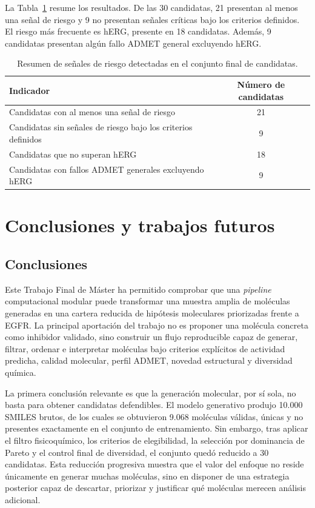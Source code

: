 \documentclass[IB]{TFUOC}%
\begin{document}
La Tabla~\ref{tab:riesgos_shortlist_resultados} resume los resultados. De las 30 candidatas, 21 presentan al menos una señal de riesgo y 9 no presentan señales críticas bajo los criterios definidos. El riesgo más frecuente es hERG, presente en 18 candidatas. Además, 9 candidatas presentan algún fallo ADMET general excluyendo hERG.

\begin{table}[H]
    \centering
    \small
    \begin{tabular}{p{8cm} c}
        \hline
        \textbf{Indicador} & \textbf{Número de candidatas} \\
        \hline
        Candidatas con al menos una señal de riesgo & 21 \\
        Candidatas sin señales de riesgo bajo los criterios definidos & 9 \\
        Candidatas que no superan hERG & 18 \\
        Candidatas con fallos ADMET generales excluyendo hERG & 9 \\
        \hline
    \end{tabular}
    \caption{Resumen de señales de riesgo detectadas en el conjunto final de candidatas.}
    \label{tab:riesgos_shortlist_resultados}
\end{table}

\chapter{Conclusiones y trabajos futuros}

\section{Conclusiones}

Este Trabajo Final de Máster ha permitido comprobar que una \textit{pipeline} computacional modular puede transformar una muestra amplia de moléculas generadas en una cartera reducida de hipótesis moleculares priorizadas frente a EGFR. La principal aportación del trabajo no es proponer una molécula concreta como inhibidor validado, sino construir un flujo reproducible capaz de generar, filtrar, ordenar e interpretar moléculas bajo criterios explícitos de actividad predicha, calidad molecular, perfil ADMET, novedad estructural y diversidad química.

La primera conclusión relevante es que la generación molecular, por sí sola, no basta para obtener candidatas defendibles. El modelo generativo produjo 10.000 SMILES brutos, de los cuales se obtuvieron 9.068 moléculas válidas, únicas y no presentes exactamente en el conjunto de entrenamiento. Sin embargo, tras aplicar el filtro fisicoquímico, los criterios de elegibilidad, la selección por dominancia de Pareto y el control final de diversidad, el conjunto quedó reducido a 30 candidatas. Esta reducción progresiva muestra que el valor del enfoque no reside únicamente en generar muchas moléculas, sino en disponer de una estrategia posterior capaz de descartar, priorizar y justificar qué moléculas merecen análisis adicional.
\end{document}
